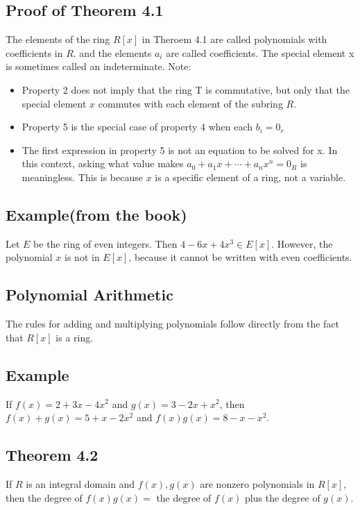 \documentclass{article}
\begin{document}
\subsection*{Proof of Theorem 4.1}
The elements of the ring $R[x]$ in Theroem 4.1 are called polynomials with coefficients in $R$.
and the elements $a_i$ are called coefficients. The special element x is sometimes called an indeterminate.
Note: 
\begin{itemize}
    \item Property 2 does not imply that the ring T is commutative, but only that the special element $x$ commutes with each element of the subring $R$.
    \item Property 5 is the special case of property 4 when each $b_i=0_r$
    \item The first expression in property 5 is not an equation to be solved for x. In this context, asking what value makes $a_0 + a_1x + \cdots + a_nx^n = 0_R$ is meaningless. This is because $x$ is a specific element of a ring, not a variable.
\end{itemize}
\subsection*{Example(from the book)}
Let $E$ be the ring of even integers. Then $4-6x+4x^3 \in E[x]$. However, the polynomial $x$ is not in $E[x]$, because it cannot be written with even coefficients.

\subsection*{Polynomial Arithmetic}
The rules for adding and multiplying polynomials follow directly from the fact that $R[x]$ is a ring.

\subsection*{Example} If $f(x) = 2+3x-4x^2$ and $g(x) = 3-2x+x^2$, then $f(x) + g(x) = 5+x-2x^2$ and $f(x)g(x) = 8-x-x^2$.

\subsection*{Theorem 4.2}
If $R$ is an integral domain and $f(x), g(x)$ are nonzero polynomials in $R[x]$, then the degree of $f(x)g(x) = $ the degree of $f(x)$ plus the degree of $g(x)$.
\end{document}
